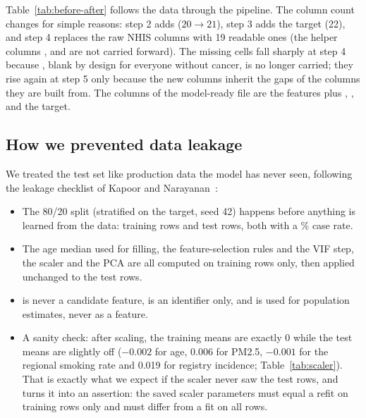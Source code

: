 Table~\ref{tab:before-after} follows the data through the pipeline. The column count changes for simple reasons: step 2 adds  ($20 \rightarrow 21$), step 3 adds the target (22), and step 4 replaces the raw NHIS columns with 19 readable ones (the helper columns ,  and  are not carried forward). The missing cells fall sharply at step 4 because , blank by design for everyone without cancer, is no longer carried; they rise again at step 5 only because the new columns inherit the gaps of the columns they are built from. The \nModelColumns columns of the model-ready file are the \nFeatures features plus , ,  and the target.

\begin{table}[htbp]
\centering\footnotesize
\caption{Rows, columns and missing cells after each preprocessing step (\texttt{data/clean/before\_after\_summary.csv}).}\label{tab:before-after}

\end{table}

\subsection{How we prevented data leakage}\label{sec:leakage}

We treated the test set like production data the model has never seen, following the leakage checklist of Kapoor and Narayanan~\cite{kapoor}:
\begin{itemize}
  \item The 80/20 split (stratified on the target, seed 42) happens before anything is learned from the data: \nTrain training rows and \nTest test rows, both with a \sampleRate\% case rate.
  \item The age median used for filling, the feature-selection rules and the VIF step, the scaler and the PCA are all computed on training rows only, then applied unchanged to the test rows.
  \item {} is never a candidate feature,  is an identifier only, and  is used for population estimates, never as a feature.
  \item A sanity check: after scaling, the training means are exactly 0 while the test means are slightly off ($-0.002$ for age, 0.006 for PM2.5, $-0.001$ for the regional smoking rate and 0.019 for registry incidence; Table~\ref{tab:scaler}). That is exactly what we expect if the scaler never saw the test rows, and  turns it into an assertion: the saved scaler parameters must equal a refit on training rows only and must differ from a fit on all rows.
\end{itemize}

